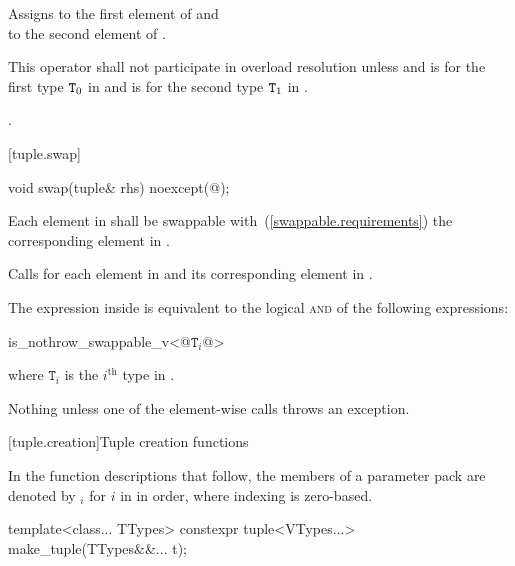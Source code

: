\begin{itemdescr}
\pnum
\effects Assigns  to the first
element of  and\\  to the
second element of .

\pnum
\remarks
This operator shall not participate in overload resolution unless
 and
 is  for the first type $\texttt{T}_0$ in
 and  is  for the second
type $\texttt{T}_1$ in .

\pnum
\returns {}.
\end{itemdescr}

[tuple.swap]{}

%
\begin{itemdecl}
void swap(tuple& rhs) noexcept(@\seebelow@);
\end{itemdecl}

\begin{itemdescr}
\pnum
\requires
Each element in  shall be swappable with~(\ref{swappable.requirements})
the corresponding element in .

\pnum
\effects Calls  for each element in  and its
corresponding element in .

\pnum
\remarks The expression inside  is equivalent to the logical
\textsc{and} of the following expressions:

\begin{codeblock}
is_nothrow_swappable_v<@$\mathtt{T}_i$@>
\end{codeblock}
where $\mathtt{T}_i$ is the $i^\text{th}$ type in .

\pnum
\throws Nothing unless one of the element-wise  calls throws an exception.
\end{itemdescr}

[tuple.creation]{Tuple creation functions}

\pnum
In the function descriptions that follow, the members of a parameter pack 
are denoted by $_i$ for $i$ in  in
order, where indexing is zero-based.

%
%
\begin{itemdecl}
template<class... TTypes>
  constexpr tuple<VTypes...> make_tuple(TTypes&&... t);
\end{itemdecl}

